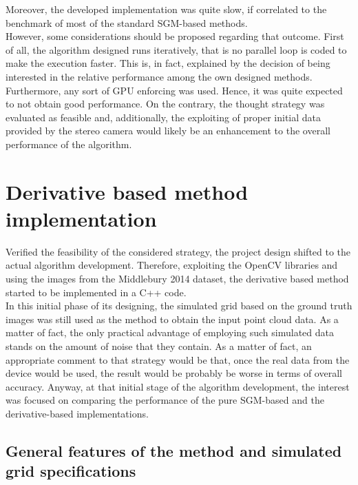 Moreover, the developed implementation was quite slow, if correlated to the benchmark of most of the standard SGM-based methods. \\
However, some considerations should be proposed regarding that outcome. 
First of all, the algorithm designed runs iteratively, that is no parallel loop is coded to make the execution faster.  
This is, in fact, explained by the decision of being interested in the relative performance among the own designed methods. 
Furthermore, any sort of GPU enforcing was used. 
Hence, it was quite expected to not obtain good performance.
On the contrary, the thought strategy was evaluated as feasible and, additionally, the exploiting of proper initial data provided by the stereo camera would likely be an enhancement to the overall performance of the algorithm. \\

\section{Derivative based method implementation}
\label{section:derivative-based}

Verified the feasibility of the considered strategy, the project design shifted to the actual algorithm development. 
Therefore, exploiting the OpenCV libraries and using the images from the Middlebury 2014 dataset, the derivative based method started to be implemented in a C++ code. \\
In this initial phase of its designing, the simulated grid based on the ground truth images was still used as the method to obtain the input point cloud data.
As a matter of fact, the only practical advantage of employing such simulated data stands on the amount of noise that they contain.
As a matter of fact, an appropriate comment to that strategy would be that, once the real data from the device would be used, the result would be probably be worse in terms of overall accuracy. 
Anyway, at that initial stage of the algorithm development, the interest was focused on comparing the performance of the pure SGM-based and the derivative-based implementations. \\

\subsection{General features of the method and simulated grid specifications}
\label{subsection:general-feature-der-method}

